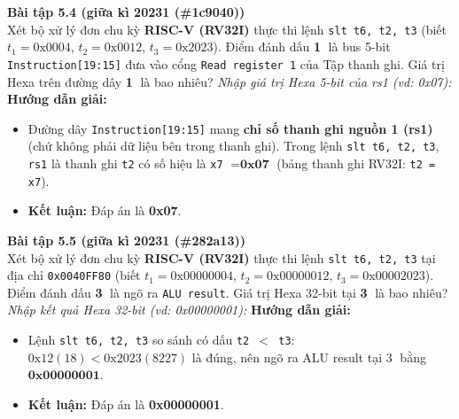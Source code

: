 \textbf{Bài tập 5.4 (giữa kì 20231 (\#1c9040))}\\
Xét bộ xử lý đơn chu kỳ \textbf{RISC-V (RV32I)} thực thi lệnh \texttt{slt t6, t2, t3} (biết $t_1 = \text{0x0004}$, $t_2 = \text{0x0012}$, $t_3 = \text{0x2023}$). Điểm đánh dấu \textbf{\textcircled{1}} là bus 5-bit \texttt{Instruction[19:15]} đưa vào cổng \texttt{Read register 1} của Tập thanh ghi. Giá trị Hexa trên đường dây \textbf{\textcircled{1}} là bao nhiêu?
\textit{Nhập giá trị Hexa 5-bit của rs1 (vd: 0x07):}
\textbf{Hướng dẫn giải:}
\begin{itemize}
    \item Đường dây \texttt{Instruction[19:15]} mang \textbf{chỉ số thanh ghi nguồn 1 (rs1)} (chứ không phải dữ liệu bên trong thanh ghi). Trong lệnh \texttt{slt t6, t2, t3}, \texttt{rs1} là thanh ghi \texttt{t2} có số hiệu là \texttt{x7} $= \mathbf{\text{0x07}}$ (bảng thanh ghi RV32I: \texttt{t2 = x7}).
    \item \textbf{Kết luận:} Đáp án là \textbf{0x07}.
\end{itemize}

\textbf{Bài tập 5.5 (giữa kì 20231 (\#282a13))}\\
Xét bộ xử lý đơn chu kỳ \textbf{RISC-V (RV32I)} thực thi lệnh \texttt{slt t6, t2, t3} tại địa chỉ \texttt{0x0040FF80} (biết $t_1 = \text{0x00000004}$, $t_2 = \text{0x00000012}$, $t_3 = \text{0x00002023}$). Điểm đánh dấu \textbf{\textcircled{3}} là ngõ ra \texttt{ALU result}. Giá trị Hexa 32-bit tại \textbf{\textcircled{3}} là bao nhiêu?
\textit{Nhập kết quả Hexa 32-bit (vd: 0x00000001):}
\textbf{Hướng dẫn giải:}
\begin{itemize}
    \item Lệnh \texttt{slt t6, t2, t3} so sánh có dấu \texttt{t2 $<$ t3}: $\text{0x12} (18) < \text{0x2023} (8227)$ là đúng, nên ngõ ra ALU result tại \textcircled{3} bằng $\mathbf{\text{0x00000001}}$.
    \item \textbf{Kết luận:} Đáp án là \textbf{0x00000001}.
\end{itemize}

